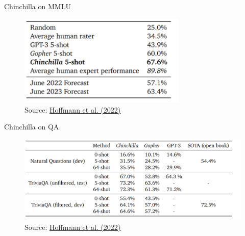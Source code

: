 
\begin{vbframe}{Chinchilla on MMLU}

\vfill

\begin{figure}
	\centering
	\includegraphics[width = 8cm]{./figure/chinchilla_mmlu.png} \\ 
	{\footnotesize Source: \href{https://arxiv.org/abs/2203.15556}{Hoffmann et al. (2022)}}
\end{figure}

\vfill

\end{vbframe}


\begin{vbframe}{Chinchilla on QA}

\vfill

\begin{figure}
	\centering
	\includegraphics[width = 12cm]{./figure/chinchilla_qa.png} \\ 
	{\footnotesize Source: \href{https://arxiv.org/abs/2203.15556}{Hoffmann et al. (2022)}}
\end{figure}

\vfill

\end{vbframe}


\endlecture


